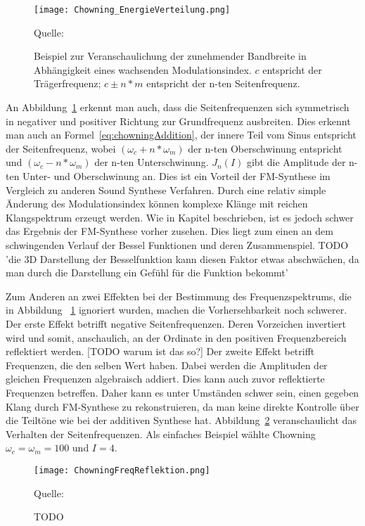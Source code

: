 \begin{figure} [ht]
\centering
  \texttt{[image: Chowning\_EnergieVerteilung.png]}
\caption{Beispiel zur Veranschaulichung der zunehmender Bandbreite in Abhängigkeit eines wachsenden Modulationsindex. $c$ entspricht der Trägerfrequenz; $c\pm n*m$ entspricht der n-ten Seitenfrequenz.}
\label{fig:chowningEnergieVerteilung}
Quelle: \cite{chowningPaper}
\end{figure}
\FloatBarrier

An Abbildung~\ref{fig:chowningEnergieVerteilung} erkennt man auch, dass die Seitenfrequenzen sich symmetrisch in negativer und positiver Richtung zur Grundfrequenz ausbreiten. Dies erkennt man auch an Formel~\ref{eq:chowningAddition}, der innere Teil vom Sinus entspricht der Seitenfrequenz, wobei $(\omega_c+n*\omega_m)$ der n-ten Oberschwinung entspricht und $(\omega_c-n*\omega_m)$ der n-ten Unterschwinung. $J_n(I)$ gibt die Amplitude der n-ten Unter- und Oberschwinung an. 
Dies ist ein Vorteil der FM-Synthese im Vergleich zu anderen Sound Synthese Verfahren. Durch eine relativ simple Änderung des Modulationsindex können komplexe Klänge mit reichen Klangspektrum erzeugt werden.
Wie in Kapitel  beschrieben, ist es jedoch schwer das Ergebnis der FM-Synthese vorher zusehen. Dies liegt zum einen an dem schwingenden Verlauf der Bessel Funktionen und deren Zusammenspiel. TODO 'die 3D Darstellung der Besselfunktion kann diesen Faktor etwas abschwächen, da man durch die Darstellung ein Gefühl für die Funktion bekommt'

Zum Anderen an zwei Effekten bei der Bestimmung des Frequenzspektrums, die in Abbildung~ \ref{fig:chowningEnergieVerteilung} ignoriert wurden, machen die Vorhersehbarkeit noch schwerer. Der erste Effekt betrifft negative Seitenfrequenzen. Deren Vorzeichen invertiert wird und somit, anschaulich, an der Ordinate in den positiven Frequenzbereich reflektiert werden. [TODO warum ist das so?] Der zweite Effekt betrifft Frequenzen, die den selben Wert haben. Dabei werden die Amplituden der gleichen Frequenzen algebraisch addiert. Dies kann auch zuvor reflektierte Frequenzen betreffen. Daher kann es unter Umständen schwer sein, einen gegeben Klang durch FM-Synthese zu rekonstruieren, da man keine direkte Kontrolle über die Teiltöne wie bei der additiven Synthese hat. Abbildung~\ref{fig:chowningFreqReflektion} veranschaulicht das Verhalten der Seitenfrequenzen. Als einfaches Beispiel wählte Chowning $\omega_c=\omega_m=100$ und $I=4$.


\begin{figure} [ht]
\centering
  \texttt{[image: ChowningFreqReflektion.png]}
\caption{TODO}
\label{fig:chowningFreqReflektion}
Quelle: \cite{chowningPaper}
\end{figure}
\FloatBarrier





